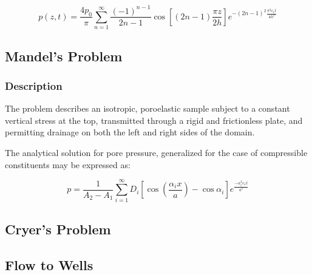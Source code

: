 \begin{equation}
 p(z,t) = \frac{4 p_{0}} {\pi} \sum_{n = 1}^{\infty} \frac{(-1)^{n-1}}{2n-1} \cos \left[ \left(2 n -1 \right) \frac{\pi z}{2 h} \right] e^{-\left(2 n - 1 \right)^{2} \frac{ \pi^{2} c_{v} t}{4 h^{2}}}
\end{equation}

\subsection{Mandel's Problem}

\subsubsection{Description}
The problem describes an isotropic, poroelastic sample subject to a constant vertical stress at the top, transmitted through a rigid and frictionless plate, and permitting drainage on both the left and right sides of the domain. 

The analytical solution for pore pressure, generalized for the case of compressible
constituents may be expressed as\cite{Cheng:Detourany:1988}:

\begin{equation}
 p = \frac{1}{A_{2} - A_{1}}   \sum_{i=1}^{\infty} D_{i} \left[ \cos \left( \frac{\alpha_{i}x}{a} \right) - \cos \alpha_{i} \right] e^{\frac{-\alpha_{i}^{2} c_{x} t}{a^{2}}} 
\end{equation}


\subsection{Cryer's Problem}

\subsection{Flow to Wells}

